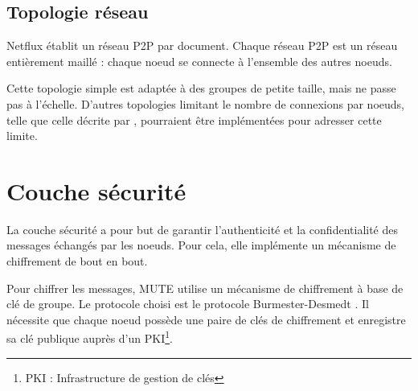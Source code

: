 \subsection{Topologie réseau}

Netflux établit un réseau \ac{P2P} par document.
Chaque réseau \ac{P2P} est un réseau entièrement maillé : chaque noeud se connecte à l'ensemble des autres noeuds.

Cette topologie simple est adaptée à des groupes de petite taille, mais ne passe pas à l'échelle.
D'autres topologies limitant le nombre de connexions par noeuds, telle que celle décrite par \cite{2018-spray-nedelec}, pourraient être implémentées pour adresser cette limite.



\section{Couche sécurité}

La couche sécurité a pour but de garantir l'authenticité et la confidentialité des messages échangés par les noeuds.
Pour cela, elle implémente un mécanisme de chiffrement de bout en bout.

Pour chiffrer les messages, MUTE utilise un mécanisme de chiffrement à base de clé de groupe.
Le protocole choisi est le protocole Burmester-Desmedt \cite{1995-burmester-desmedt}.
Il nécessite que chaque noeud possède une paire de clés de chiffrement et enregistre sa clé publique auprès d'un PKI\footnote{\acf{PKI} : Infrastructure de gestion de clés}.

